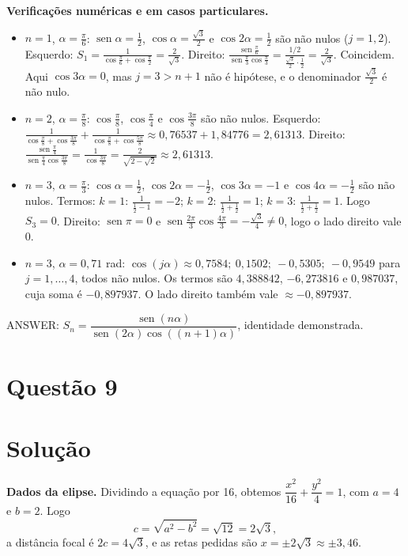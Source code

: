 \documentclass{article}%
\begin{document}
\textbf{Verificações numéricas e em casos particulares.}
\begin{itemize}
\item $n=1$, $\alpha=\frac{\pi}{6}$: $\operatorname{sen}\alpha=\frac12$, $\cos\alpha=\frac{\sqrt3}{2}$ e $\cos2\alpha=\frac12$ são não nulos ($j=1,2$). Esquerdo: $S_1=\frac{1}{\cos\frac{\pi}{6}+\cos\frac{\pi}{2}}=\frac{2}{\sqrt3}$. Direito: $\frac{\operatorname{sen}\frac{\pi}{6}}{\operatorname{sen}\frac{\pi}{3}\cos\frac{\pi}{3}}=\frac{1/2}{\frac{\sqrt3}{2}\cdot\frac12}=\frac{2}{\sqrt3}$. Coincidem. Aqui $\cos3\alpha=0$, mas $j=3>n+1$ não é hipótese, e o denominador $\frac{\sqrt3}{2}$ é não nulo.
\item $n=2$, $\alpha=\frac{\pi}{8}$: $\cos\frac{\pi}{8}$, $\cos\frac{\pi}{4}$ e $\cos\frac{3\pi}{8}$ são não nulos. Esquerdo: $\frac{1}{\cos\frac{\pi}{8}+\cos\frac{3\pi}{8}}+\frac{1}{\cos\frac{\pi}{8}+\cos\frac{5\pi}{8}}\approx 0{,}76537+1{,}84776=2{,}61313$. Direito: $\frac{\operatorname{sen}\frac{\pi}{4}}{\operatorname{sen}\frac{\pi}{4}\cos\frac{3\pi}{8}}=\frac{1}{\cos\frac{3\pi}{8}}=\frac{2}{\sqrt{2-\sqrt2}}\approx 2{,}61313$.
\item $n=3$, $\alpha=\frac{\pi}{3}$: $\cos\alpha=\frac12$, $\cos2\alpha=-\frac12$, $\cos3\alpha=-1$ e $\cos4\alpha=-\frac12$ são não nulos. Termos: $k=1$: $\frac{1}{\frac12-1}=-2$; $k=2$: $\frac{1}{\frac12+\frac12}=1$; $k=3$: $\frac{1}{\frac12+\frac12}=1$. Logo $S_3=0$. Direito: $\operatorname{sen}\pi=0$ e $\operatorname{sen}\frac{2\pi}{3}\cos\frac{4\pi}{3}=-\frac{\sqrt3}{4}\neq 0$, logo o lado direito vale $0$.
\item $n=3$, $\alpha=0{,}71$ rad: $\cos(j\alpha)\approx 0{,}7584;\ 0{,}1502;\ -0{,}5305;\ -0{,}9549$ para $j=1,\dots,4$, todos não nulos. Os termos são $4{,}388842$, $-6{,}273816$ e $0{,}987037$, cuja soma é $-0{,}897937$. O lado direito também vale $\approx -0{,}897937$.
\end{itemize}

ANSWER: $S_n=\dfrac{\operatorname{sen}(n\alpha)}{\operatorname{sen}(2\alpha)\cos((n+1)\alpha)}$, identidade demonstrada.%
\newpage%
\section*{Questão 9}

\section*{Solução}

\textbf{Dados da elipse.} Dividindo a equação por 16, obtemos $\dfrac{x^2}{16}+\dfrac{y^2}{4}=1$, com $a=4$ e $b=2$. Logo
$$c=\sqrt{a^2-b^2}=\sqrt{12}=2\sqrt{3},$$
a distância focal é $2c=4\sqrt{3}$, e as retas pedidas são $x=\pm 2\sqrt{3}\approx \pm 3{,}46$.
\end{document}
